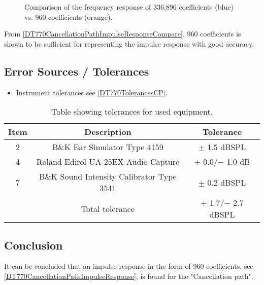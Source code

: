 \begin{figure}[H]
	\centering
	
	\caption{Comparison of the frequency response of 336,896 coefficients (blue) vs. 960 coefficients (orange).}
	\label{DT770CancellationPathImpulseResponseCompare}
\end{figure}

From \autoref{DT770CancellationPathImpulseResponseCompare}, 960 coefficients is shown to be sufficient for representing the impulse response with good accuracy. 

\subsection{Error Sources / Tolerances}
\begin{itemize}
	\item Instrument tolerances see \autoref{DT770TolerancesCP}.
\end{itemize}

\begin{table}[H]
	\centering
	\begin{tabular}{ c c c } \toprule
		{Item}	& 		{Description} 	& {Tolerance}	 \\ \bottomrule 
		2	&	B\&K Ear Simulator Type 4159				& $\pm$ 1.5 dBSPL \cite{BK4159Tol} 	\\
		4	&	Roland Edirol UA-25EX Audio Capture			& $+$ 0.0/$-$ 1.0 dB \cite{UA25EXTol} \\
		7	&	B\&K Sound Intensity Calibrator Type 3541	& $\pm$ 0.2 dBSPL \cite{BK3541Tol}	\\ \bottomrule
			&	Total tolerance								& $+$ 1.7/$-$ 2.7 dBSPL	\\ \bottomrule	
	\end{tabular}
	\caption{Table showing tolerances for used equipment.}
	\label{DT770TolerancesCP}
\end{table}

\subsection{Conclusion}
It can be concluded that an impulse response in the form of 960 coefficients, see \autoref{DT770CancellationPathImpulseResponse}, is found for the "Cancellation path".

